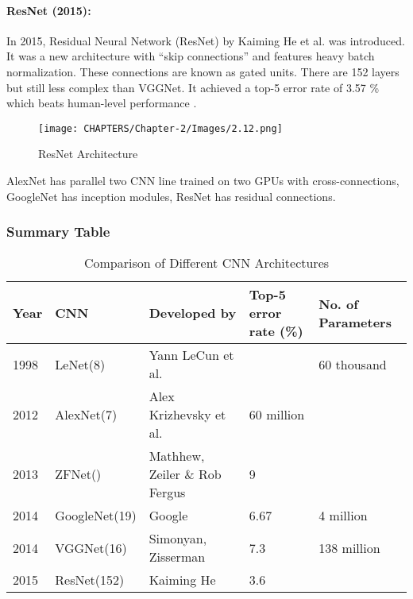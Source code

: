 \paragraph*{ResNet (2015):}
In 2015, Residual Neural Network (ResNet) by Kaiming He et al. was introduced. It was a new
architecture with “skip connections” and features heavy batch normalization. These connections are known as gated units. There are 152 layers but still less complex than VGGNet. It achieved a top-5 
error rate of 3.57 \% which beats human-level performance \cite{chap_2_article:14}. 

\begin{figure}[H]
    \centering
    \captionsetup{justification=centering,margin=2cm}
    \texttt{[image: CHAPTERS/Chapter-2/Images/2.12.png]}
    \caption{ResNet Architecture}
    \label{fig:2.11}
\end{figure}

AlexNet has parallel two CNN line trained on two GPUs with cross-connections, GoogleNet has 
inception modules, ResNet has residual connections.

\subsubsection*{Summary Table}
\begin{table}[H]
    \caption{Comparison of Different CNN Architectures}
      \begin{center}
        \scalebox{.85}
        {\begin{tabular}{|l |l |l |l |l |}
        \hline
        Year & CNN & Developed by & Top-5 error rate (\%) & No. of Parameters \\ \hline
        1998  & LeNet(8) & Yann LeCun et al. &  &  60 thousand 
        \\ \hline
        2012  & AlexNet(7) & Alex Krizhevsky et al. & 60 million &
        \\ \hline
        2013   & ZFNet() &  Mathhew, Zeiler \& Rob Fergus & 9 &
        \\ \hline %
        2014 & GoogleNet(19) & Google & 6.67  & 4 million
        \\ \hline
        2014 & VGGNet(16) & Simonyan, Zisserman & 7.3 & 138 million
        \\ \hline
        2015 & ResNet(152)& Kaiming He & 3.6 & 
        \\ \hline   
        \end{tabular}}
      \end{center}
\end{table}

